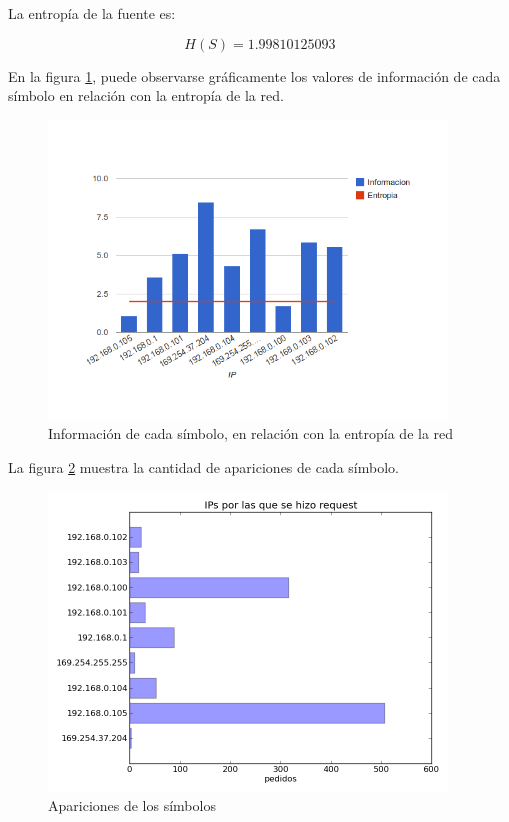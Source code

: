 \documentclass{article}
\begin{document}
\vskip10pt

La entropía de la fuente es:

$$H(S) = 1.99810125093$$

En la figura \ref{fig:red1requested:infoentro}, puede observarse gráficamente
los valores de información de cada símbolo en relación con la entropía de la
red.

\begin{figure}[h!]
    \centering                                                       
    \includegraphics[width=300pt]{consultadas1.png}
    \caption{Información de cada símbolo, en relación con la
        entropía de la red}
    \label{fig:red1requested:infoentro}
\end{figure}

La figura \ref{fig:red1requested:count} muestra la cantidad de apariciones de
cada símbolo.

\begin{figure}[h!]
    \centering
    \includegraphics[width=300pt]{red1requested.png}
    \caption{Apariciones de los símbolos}
    \label{fig:red1requested:count}
\end{figure}
\end{document}
